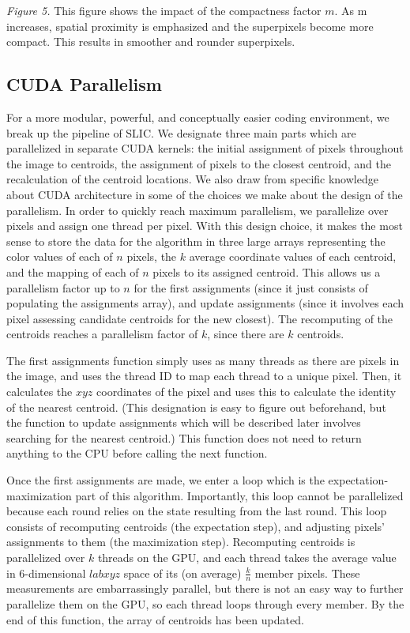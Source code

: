 \documentclass[11pt,twocolumn]{article}
\begin{document}
\textit{Figure 5.} This figure shows the impact of the compactness factor $m$. As m increases, spatial proximity is emphasized and the superpixels become more compact. This results in smoother and rounder superpixels. 

\subsection{CUDA Parallelism}


For a more modular, powerful, and conceptually easier coding environment, we break up the pipeline of SLIC. We designate three main parts which are parallelized in separate CUDA kernels: the initial assignment of pixels throughout the image to centroids, the assignment of pixels to the closest centroid, and the recalculation of the centroid locations. We also draw from specific knowledge about CUDA architecture in some of the choices we make about the design of the parallelism. In order to quickly reach maximum parallelism, we parallelize over pixels and assign one thread per pixel. With this design choice, it makes the most sense to store the data for the algorithm in three large arrays representing the color values of each of $n$ pixels, the $k$ average coordinate values of each centroid, and the mapping of each of $n$ pixels to its assigned centroid. This allows us a parallelism factor up to $n$ for the first assignments (since it just consists of populating the assignments array), and update assignments (since it involves each pixel assessing candidate centroids for the new closest). The recomputing of the centroids reaches a parallelism factor of $k$, since there are $k$ centroids.

The first assignments function simply uses as many threads as there are pixels in the image, and uses the thread ID to map each thread to a unique pixel. Then, it calculates the $xyz$ coordinates of the pixel and uses this to calculate the identity of the nearest centroid. (This designation is easy to figure out beforehand, but the function to update assignments which will be described later involves searching for the nearest centroid.) This function does not need to return anything to the CPU before calling the next function.

Once the first assignments are made, we enter a loop which is the expectation-maximization part of this algorithm. Importantly, this loop cannot be parallelized because each round relies on the state resulting from the last round. This loop consists of recomputing centroids (the expectation step), and adjusting pixels' assignments to them (the maximization step). Recomputing centroids is parallelized over $k$ threads on the GPU, and each thread takes the average value in 6-dimensional $labxyz$ space of its (on average) $\frac{k}{n}$ member pixels. These measurements are embarrassingly parallel, but there is not an easy way to further parallelize them on the GPU, so each thread loops through every member. By the end of this function, the array of centroids has been updated.
\end{document}
